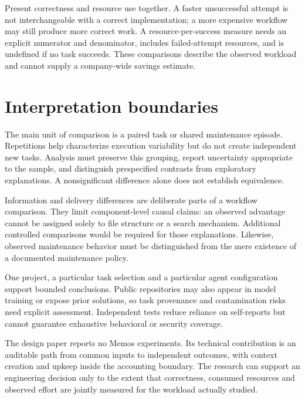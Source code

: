 \documentclass[11pt,letterpaper,twocolumn]{article}
\begin{document}
Present correctness and resource use together. A faster unsuccessful attempt is not interchangeable with a correct implementation; a more expensive workflow may still produce more correct work. A resource-per-success measure needs an explicit numerator and denominator, includes failed-attempt resources, and is undefined if no task succeeds. These comparisons describe the observed workload and cannot supply a company-wide savings estimate.

\section{Interpretation boundaries}
The main unit of comparison is a paired task or shared maintenance episode. Repetitions help characterize execution variability but do not create independent new tasks. Analysis must preserve this grouping, report uncertainty appropriate to the sample, and distinguish prespecified contrasts from exploratory explanations. A nonsignificant difference alone does not establish equivalence.

Information and delivery differences are deliberate parts of a workflow comparison. They limit component-level causal claims: an observed advantage cannot be assigned solely to file structure or a search mechanism. Additional controlled comparisons would be required for those explanations. Likewise, observed maintenance behavior must be distinguished from the mere existence of a documented maintenance policy.

One project, a particular task selection and a particular agent configuration support bounded conclusions. Public repositories may also appear in model training or expose prior solutions, so task provenance and contamination risks need explicit assessment. Independent tests reduce reliance on self-reports but cannot guarantee exhaustive behavioral or security coverage.

The design paper reports no Memos experiments. Its technical contribution is an auditable path from common inputs to independent outcomes, with context creation and upkeep inside the accounting boundary. The research can support an engineering decision only to the extent that correctness, consumed resources and observed effort are jointly measured for the workload actually studied.

\raggedright
{}


\end{document}
